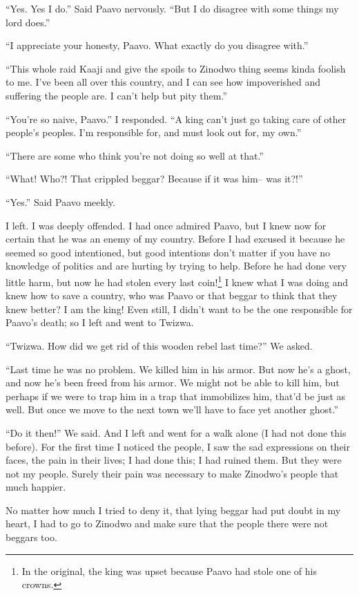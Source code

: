 ``Yes. Yes I do.'' Said Paavo nervously. ``But I do disagree with some things my lord does.''

``I appreciate your honesty, Paavo. What exactly do you disagree with.''

``This whole raid Kaaji and give the spoils to Zinodwo thing seems kinda foolish to me. I've been all over this country, and I can see how impoverished and suffering the people are. I can't help but pity them.''

``You're so naive, Paavo.'' I responded. ``A king can't just go taking care of other people's peoples. I'm responsible for, and must look out for, my own.''

``There are some who think you're not doing so well at that.''

``What! Who?! That crippled beggar? Because if it was him-- was it?!''

``Yes.'' Said Paavo meekly.

I left. I was deeply offended. I had once admired Paavo, but I knew now for certain that he was an enemy of my country. Before I had excused it because he seemed so good intentioned, but good intentions don't matter if you have no knowledge of politics and are hurting by trying to help. Before he had done very little harm, but now he had stolen every last coin!\footnote{In the original, the king was upset because Paavo had stole one of his crowns.} I knew what I was doing and knew how to save a country, who was Paavo or that beggar to think that they knew better? I am the king! Even still, I didn't want to be the one responsible for Paavo's death; so I left and went to Twizwa.

``Twizwa. How did we get rid of this wooden rebel last time?'' We asked.

``Last time he was no problem. We killed him in his armor. But now he's a ghost, and now he's been freed from his armor. We might not be able to kill him, but perhaps if we were to trap him in a trap that immobilizes him, that'd be just as well. But once we move to the next town we'll have to face yet another ghost.''

``Do it then!'' We said. And I left and went for a walk alone (I had not done this before). For the first time I noticed the people, I saw the sad expressions on their faces, the pain in their lives; I had done this; I had ruined them. But they were not my people. Surely their pain was necessary to make Zinodwo's people that much happier.

No matter how much I tried to deny it, that lying beggar had put doubt in my heart, I had to go to Zinodwo and make sure that the people there were not beggars too.
